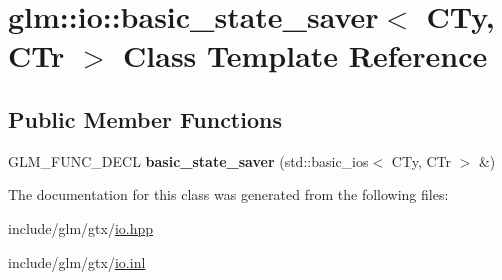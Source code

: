 \hypertarget{classglm_1_1io_1_1basic__state__saver}{}\section{glm\+:\+:io\+:\+:basic\+\_\+state\+\_\+saver$<$ C\+Ty, C\+Tr $>$ Class Template Reference}
\label{classglm_1_1io_1_1basic__state__saver}
\subsection*{Public Member Functions}
\begin{DoxyCompactItemize}
\item 
\mbox{\label{classglm_1_1io_1_1basic__state__saver_ab31652b0b7f2a24fa8f9fda2505de356}} 
G\+L\+M\+\_\+\+F\+U\+N\+C\+\_\+\+D\+E\+CL {\bfseries basic\+\_\+state\+\_\+saver} (std\+::basic\+\_\+ios$<$ C\+Ty, C\+Tr $>$ \&)
\end{DoxyCompactItemize}


The documentation for this class was generated from the following files\+:\begin{DoxyCompactItemize}
\item 
include/glm/gtx/\hyperlink{io_8hpp}{io.\+hpp}\item 
include/glm/gtx/\hyperlink{io_8inl}{io.\+inl}\end{DoxyCompactItemize}
